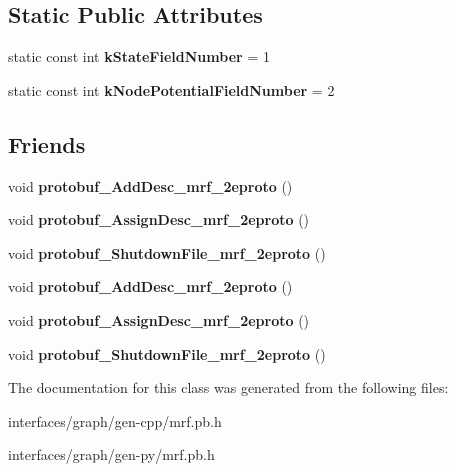 \subsection*{Static Public Attributes}
\begin{DoxyCompactItemize}
\item 
\hypertarget{classgraph_1_1NodeStatePotential_a265420a2f3c1e9f0eeda17b43ea4d21f}{
static const int {\bfseries kStateFieldNumber} = 1}
\label{classgraph_1_1NodeStatePotential_a265420a2f3c1e9f0eeda17b43ea4d21f}

\item 
\hypertarget{classgraph_1_1NodeStatePotential_a3a181bd7c694d93d54519675fee7218f}{
static const int {\bfseries kNodePotentialFieldNumber} = 2}
\label{classgraph_1_1NodeStatePotential_a3a181bd7c694d93d54519675fee7218f}

\end{DoxyCompactItemize}
\subsection*{Friends}
\begin{DoxyCompactItemize}
\item 
\hypertarget{classgraph_1_1NodeStatePotential_a7c7daba01236a33140ac99dfb4a21f58}{
void {\bfseries protobuf\_\-AddDesc\_\-mrf\_\-2eproto} ()}
\label{classgraph_1_1NodeStatePotential_a7c7daba01236a33140ac99dfb4a21f58}

\item 
\hypertarget{classgraph_1_1NodeStatePotential_aef3db81db7837e30d95a050165bc180f}{
void {\bfseries protobuf\_\-AssignDesc\_\-mrf\_\-2eproto} ()}
\label{classgraph_1_1NodeStatePotential_aef3db81db7837e30d95a050165bc180f}

\item 
\hypertarget{classgraph_1_1NodeStatePotential_a84e801a5b8303ac698fb7040b250e3d1}{
void {\bfseries protobuf\_\-ShutdownFile\_\-mrf\_\-2eproto} ()}
\label{classgraph_1_1NodeStatePotential_a84e801a5b8303ac698fb7040b250e3d1}

\item 
\hypertarget{classgraph_1_1NodeStatePotential_a7c7daba01236a33140ac99dfb4a21f58}{
void {\bfseries protobuf\_\-AddDesc\_\-mrf\_\-2eproto} ()}
\label{classgraph_1_1NodeStatePotential_a7c7daba01236a33140ac99dfb4a21f58}

\item 
\hypertarget{classgraph_1_1NodeStatePotential_aef3db81db7837e30d95a050165bc180f}{
void {\bfseries protobuf\_\-AssignDesc\_\-mrf\_\-2eproto} ()}
\label{classgraph_1_1NodeStatePotential_aef3db81db7837e30d95a050165bc180f}

\item 
\hypertarget{classgraph_1_1NodeStatePotential_a84e801a5b8303ac698fb7040b250e3d1}{
void {\bfseries protobuf\_\-ShutdownFile\_\-mrf\_\-2eproto} ()}
\label{classgraph_1_1NodeStatePotential_a84e801a5b8303ac698fb7040b250e3d1}

\end{DoxyCompactItemize}


The documentation for this class was generated from the following files:\begin{DoxyCompactItemize}
\item 
interfaces/graph/gen-\/cpp/mrf.pb.h\item 
interfaces/graph/gen-\/py/mrf.pb.h\end{DoxyCompactItemize}

